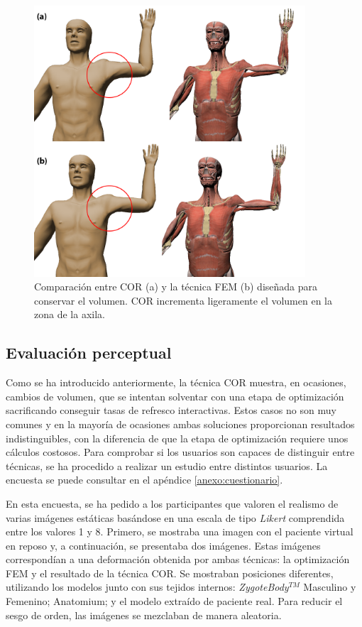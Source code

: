 \begin{figure}[ht]%
   \centering
   \includegraphics[width=0.9\textwidth]{IMG/AntCOR}
    \caption{ Comparación entre \acs{COR} (a) y la técnica \acs{FEM} (b) diseñada para conservar el volumen. \acs{COR} incrementa ligeramente el volumen en la zona de la axila.}
    \label{fig:anatomium}
\end{figure}

\subsection{Evaluación perceptual}


%
Como se ha introducido anteriormente, la técnica \ac{COR} muestra, en ocasiones, cambios de volumen, que se intentan solventar con una etapa de optimización sacrificando conseguir tasas de refresco interactivas. Estos casos no son muy comunes y en la mayoría de ocasiones ambas soluciones proporcionan resultados indistinguibles, con la diferencia de que la etapa de optimización requiere unos cálculos costosos. 
Para comprobar si los usuarios son capaces de distinguir entre técnicas, se ha procedido a realizar un estudio entre distintos usuarios. La encuesta se puede consultar en el apéndice \ref{anexo:cuestionario}.

En esta encuesta, se ha pedido a los participantes que valoren el realismo de varias imágenes estáticas basándose en una escala de tipo \emph{Likert} comprendida entre los valores 1 y 8. Primero, se mostraba una imagen con el paciente virtual en reposo
y, a continuación, se presentaba dos  imágenes. Estas imágenes correspondían a una deformación obtenida por ambas técnicas: la optimización \ac{FEM} y el resultado de la técnica \ac{COR}. Se mostraban posiciones diferentes, utilizando los modelos junto con sus tejidos internos: \emph{ZygoteBody}$^{TM}$ Masculino y Femenino; Anatomium; y el modelo extraído de paciente real. Para reducir el sesgo de orden, las imágenes se mezclaban de manera aleatoria.


